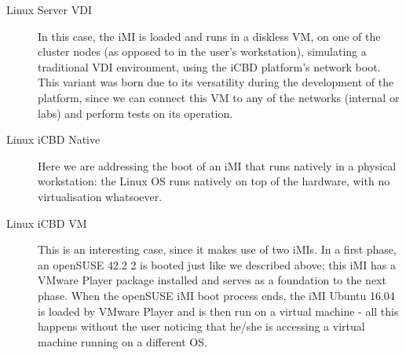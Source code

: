 \begin{description}
	\item [Linux Server VDI] In this case, the iMI is loaded and runs in a diskless VM, on one of the cluster nodes (as opposed to in the user's workstation), simulating a traditional VDI environment, using the iCBD platform's network boot. This variant was born due to its versatility during the development of the platform, since we can connect this VM to any of the networks (internal or labs) and perform tests on its operation.
	\item [Linux iCBD Native] Here we are addressing the boot of an iMI that runs natively in a physical workstation: the Linux OS runs natively on top of the hardware, with no virtualisation whatsoever.
	\item [Linux iCBD VM] This is an interesting case, since it makes use of two iMIs. In a first phase, an openSUSE 42.2 2 is booted just like we described above; this iMI has a VMware Player package installed and serves as a foundation to the next phase. When the openSUSE iMI boot process ends, the iMI Ubuntu 16.04 is loaded by VMware Player and is then run on a virtual machine - all this happens without the user noticing that he/she is accessing a virtual machine running on a different OS.
\end{description}


